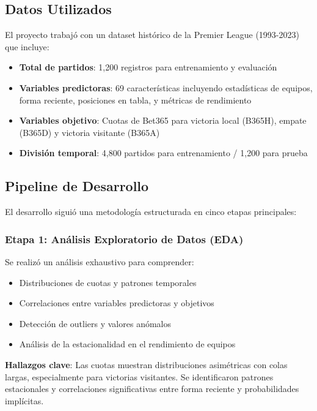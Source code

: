 \documentclass{article}
\begin{document}
\subsection{Datos Utilizados}

El proyecto trabajó con un dataset histórico de la Premier League (1993-2023) que incluye:

\begin{itemize}
    \item \textbf{Total de partidos}: 1,200 registros para entrenamiento y evaluación
    \item \textbf{Variables predictoras}: 69 características incluyendo estadísticas de equipos, forma reciente, posiciones en tabla, y métricas de rendimiento
    \item \textbf{Variables objetivo}: Cuotas de Bet365 para victoria local (B365H), empate (B365D) y victoria visitante (B365A)
    \item \textbf{División temporal}: 4,800 partidos para entrenamiento / 1,200 para prueba
\end{itemize}

\subsection{Pipeline de Desarrollo}

El desarrollo siguió una metodología estructurada en cinco etapas principales:

\subsubsection{Etapa 1: Análisis Exploratorio de Datos (EDA)}

Se realizó un análisis exhaustivo para comprender:
\begin{itemize}
    \item Distribuciones de cuotas y patrones temporales
    \item Correlaciones entre variables predictoras y objetivos
    \item Detección de outliers y valores anómalos
    \item Análisis de la estacionalidad en el rendimiento de equipos
\end{itemize}

\textbf{Hallazgos clave}: Las cuotas muestran distribuciones asimétricas con colas largas, especialmente para victorias visitantes. Se identificaron patrones estacionales y correlaciones significativas entre forma reciente y probabilidades implícitas.
\end{document}
